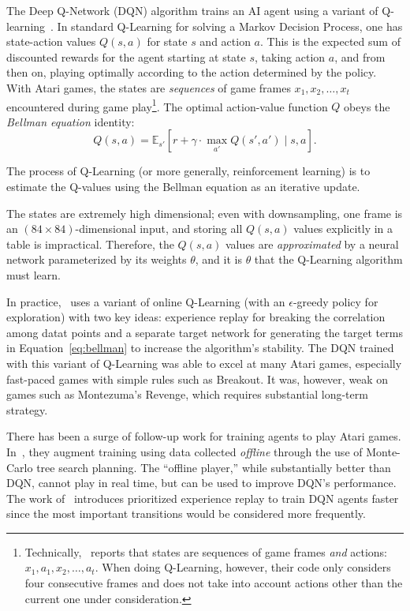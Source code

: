 \documentclass[letterpaper, 10pt, conference]{ieeeconf}
\begin{document}
The Deep Q-Network (DQN) algorithm trains an AI agent using a variant of
Q-learning~\cite{Sutton_1998}. In standard Q-Learning for solving a Markov
Decision Process, one has state-action values $Q(s,a)$ for state $s$ and action
$a$. This is the expected sum of discounted rewards for the agent starting at
state $s$, taking action $a$, and from then on, playing optimally according to
the action determined by the policy.  With Atari games, the states are
\emph{sequences} of game frames $x_1,x_2,\ldots,x_t$ encountered during game
play\footnote{Technically,~\cite{mnih-dqn-2015} reports that states are
sequences of game frames \emph{and} actions: $x_1,a_1,x_2,\ldots,a_t$. When
doing Q-Learning, however, their code only considers four consecutive frames and
does not take into account actions other than the current one under
consideration.}. The optimal action-value function $Q$ obeys the \emph{Bellman
equation} identity: 
\begin{equation}\label{eq:bellman}
Q(s,a) = \mathbb{E}_{s'}\left[r + \gamma \cdot \max_{a'} Q(s',a') \mid s,a \right].
\end{equation}

The process of Q-Learning (or more generally, reinforcement learning) is to
estimate the Q-values using the Bellman equation as an iterative update.

The states are extremely high dimensional; even with downsampling, one frame is
an $(84\times 84)$-dimensional input, and storing all $Q(s,a)$ values explicitly
in a table is impractical.  Therefore, the $Q(s,a)$ values are
\emph{approximated} by a neural network parameterized by its weights $\theta$,
and it is $\theta$ that the Q-Learning algorithm must learn.

In practice,~\cite{mnih-dqn-2015} uses a variant of online Q-Learning (with an
$\epsilon$-greedy policy for exploration) with two key ideas: experience replay
for breaking the correlation among datat points and a separate target network
for generating the target terms in Equation~\ref{eq:bellman} to increase the
algorithm's stability. The DQN trained with this variant of Q-Learning was able
to excel at many Atari games, especially fast-paced games with simple rules such
as Breakout. It was, however, weak on games such as Montezuma's Revenge, which
requires substantial long-term strategy.

There has been a surge of follow-up work for training agents to play Atari
games.  In~\cite{nips-atari-2014}, they augment training using data collected
\emph{offline} through the use of Monte-Carlo tree search planning. The
``offline player,'' while substantially better than DQN, cannot play in real
time, but can be used to improve DQN's performance. The work
of~\cite{Schaul2016} introduces prioritized experience replay to
train DQN agents faster since the most important transitions would be considered
more frequently. 
\end{document}
